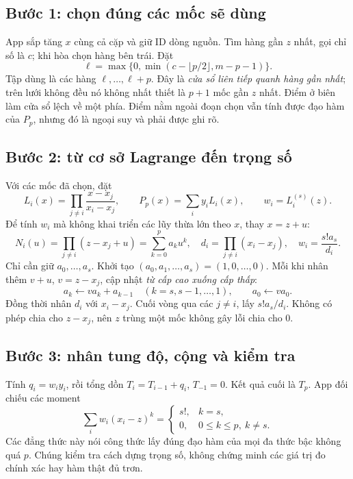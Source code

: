 \subsection{Bước 1: chọn đúng các mốc sẽ dùng}
App sắp tăng $x$ cùng cả cặp và giữ ID dòng nguồn. Tìm hàng gần $z$ nhất, gọi chỉ số là $c$; khi hòa chọn hàng bên trái. Đặt
\[
\ell=\max\{0,\min(c-\lfloor p/2\rfloor,m-p-1)\}.
\]
Tập dùng là các hàng $\ell,\ldots,\ell+p$. Đây là \emph{cửa sổ liên tiếp quanh hàng gần nhất}; trên lưới không đều nó không nhất thiết là $p+1$ mốc gần $z$ nhất. Điểm ở biên làm cửa sổ lệch về một phía. Điểm nằm ngoài đoạn chọn vẫn tính được đạo hàm của $P_p$, nhưng đó là ngoại suy và phải được ghi rõ.

\subsection{Bước 2: từ cơ sở Lagrange đến trọng số}
Với các mốc đã chọn, đặt
\[
L_i(x)=\prod_{j\ne i}\frac{x-x_j}{x_i-x_j},\qquad
P_p(x)=\sum_i y_iL_i(x),\qquad w_i=L_i^{(s)}(z).
\]
Để tính $w_i$ mà không khai triển các lũy thừa lớn theo $x$, thay $x=z+u$:
\[
N_i(u)=\prod_{j\ne i}(z-x_j+u)=\sum_{k=0}^{p}a_k u^k,
\quad d_i=\prod_{j\ne i}(x_i-x_j),
\quad w_i=\frac{s!a_s}{d_i}.
\]
Chỉ cần giữ $a_0,\ldots,a_s$. Khởi tạo $(a_0,a_1,\ldots,a_s)=(1,0,\ldots,0)$. Mỗi khi nhân thêm $v+u$, $v=z-x_j$, cập nhật \emph{từ cấp cao xuống cấp thấp}:
\[
a_k\leftarrow va_k+a_{k-1}\quad(k=s,s-1,\ldots,1),\qquad a_0\leftarrow va_0.
\]
Đồng thời nhân $d_i$ với $x_i-x_j$. Cuối vòng qua các $j\ne i$, lấy $s!a_s/d_i$. Không có phép chia cho $z-x_j$, nên $z$ trùng một mốc không gây lỗi chia cho 0.

\subsection{Bước 3: nhân tung độ, cộng và kiểm tra}
Tính $q_i=w_i y_i$, rồi tổng dồn $T_i=T_{i-1}+q_i$, $T_{-1}=0$. Kết quả cuối là $T_p$. App đối chiếu các moment
\[
\sum_iw_i(x_i-z)^k=
\begin{cases}s!,&k=s,\\0,&0\le k\le p,\ k\ne s.\end{cases}
\]
Các đẳng thức này nói công thức lấy đúng đạo hàm của mọi đa thức bậc không quá $p$. Chúng kiểm tra cách dựng trọng số, không chứng minh các giá trị đo chính xác hay hàm thật đủ trơn.

